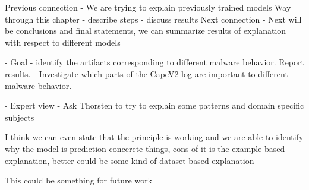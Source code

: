 Previous connection
- We are trying to explain previously trained models
Way through this chapter
- describe steps
- discuss results
Next connection
- Next will be conclusions and final statements, we can summarize results of explanation with respect to different models


- Goal 
- identify the artifacts corresponding to different malware behavior. Report results.
- Investigate which parts of the CapeV2 log are important to different malware behavior. 

- Expert view
  - Ask Thorsten to try to explain some patterns and domain specific subjects 


I think we can even state that the principle is working and we are able to identify why the model is prediction concerete things, cons of it is the example based explanation, better could be some kind of dataset based explanation

This could be something for future work

